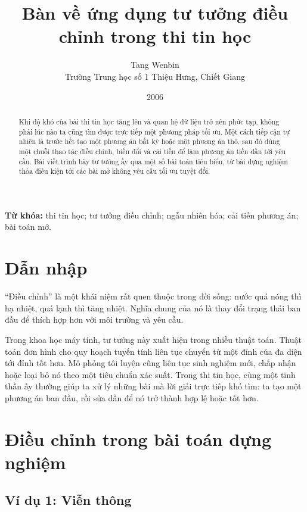 \documentclass[11pt]{article}
\title{Bàn về ứng dụng tư tưởng điều chỉnh trong thi tin học}
\author{Tang Wenbin\\Trường Trung học số 1 Thiệu Hưng, Chiết Giang}
\date{2006}
\begin{document}
\maketitle


\renewcommand{\abstractname}{Tóm tắt}
\begin{abstract}
Khi độ khó của bài thi tin học tăng lên và quan hệ dữ liệu trở nên phức tạp,
không phải lúc nào ta cũng tìm được trực tiếp một phương pháp tối ưu. Một cách
tiếp cận tự nhiên là trước hết tạo một phương án bất kỳ hoặc một phương án thô,
sau đó dùng một chuỗi thao tác điều chỉnh, biến đổi và cải tiến để làm phương
án tiến dần tới yêu cầu. Bài viết trình bày tư tưởng ấy qua một số bài toán
tiêu biểu, từ bài dựng nghiệm thỏa điều kiện tới các bài mở không yêu cầu tối
ưu tuyệt đối.
\end{abstract}

\noindent\textbf{Từ khóa:} thi tin học; tư tưởng điều chỉnh; ngẫu nhiên hóa;
cải tiến phương án; bài toán mở.

\section{Dẫn nhập}

``Điều chỉnh'' là một khái niệm rất quen thuộc trong đời sống: nước quá nóng
thì hạ nhiệt, quá lạnh thì tăng nhiệt. Nghĩa chung của nó là thay đổi trạng
thái ban đầu để thích hợp hơn với môi trường và yêu cầu.

Trong khoa học máy tính, tư tưởng này xuất hiện trong nhiều thuật toán. Thuật
toán đơn hình cho quy hoạch tuyến tính liên tục chuyển từ một đỉnh của đa diện
tới đỉnh tốt hơn. Mô phỏng tôi luyện cũng liên tục sinh nghiệm mới, chấp nhận
hoặc loại bỏ nó theo một tiêu chuẩn xác suất. Trong thi tin học, cùng một tinh
thần ấy thường giúp ta xử lý những bài mà lời giải trực tiếp khó tìm: ta tạo
một phương án ban đầu, rồi sửa dần để nó trở thành hợp lệ hoặc tốt hơn.

\section{Điều chỉnh trong bài toán dựng nghiệm}

\subsection{Ví dụ 1: Viễn thông}
\end{document}
